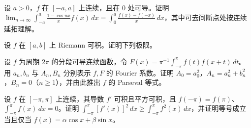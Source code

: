 \noindent\begin{minipage}{\textwidth}
设 $a>0$，$f$ 在 $[-a,a]$ 上连续，且在 $0$ 处可导。证明 $\displaystyle\lim_{n\to\infty}\int_{-a}^{a}\frac{1-\cos nx}{x}f(x)\,dx=\int_0^a\frac{f(x)-f(-x)}{x}\,dx$，其中可去间断点处按连续延拓理解。
\end{minipage}\par\vfill
\noindent\begin{minipage}{\textwidth}
设 $f$ 在 $[a,b]$ 上 Riemann 可积。证明下列极限。
\end{minipage}\par\vfill
\noindent\begin{minipage}{\textwidth}
设 $f$ 为周期 $2\pi$ 的分段可导连续函数，令 $F(x)=\pi^{-1}\int_{-\pi}^{\pi}f(t)f(x+t)\,dt$。用 $a_n,b_n$ 与 $A_n,B_n$ 分别表示 $f,F$ 的 Fourier 系数。证明 $A_0=a_0^2$，$A_n=a_n^2+b_n^2$，$B_n=0$（$n\ge1$），并由此推出 $f$ 的 Parseval 等式。
\end{minipage}\par\vfill
\newpage
\noindent\begin{minipage}{\textwidth}
设 $f$ 在 $[-\pi,\pi]$ 上连续，其导数 $f'$ 可积且平方可积，且 $f(-\pi)=f(\pi)$、$\int_{-\pi}^{\pi}f(x)\,dx=0$。证明 $\displaystyle\int_{-\pi}^{\pi}[f'(x)]^2\,dx\ge\int_{-\pi}^{\pi}f^2(x)\,dx$，并证明等号成立当且仅当 $f(x)=\alpha\cos x+\beta\sin x$。
\end{minipage}\par\vfill
